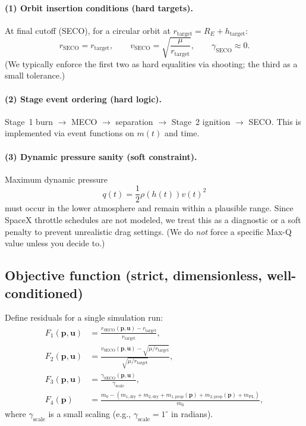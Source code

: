 \documentclass[11pt]{article}
\begin{document}
\paragraph{(1) Orbit insertion conditions (hard targets).}
At final cutoff (SECO), for a circular orbit at $r_{\text{target}}=R_E+h_{\text{target}}$:
\begin{equation}\label{eq:orbit_targets}
r_{\text{SECO}} = r_{\text{target}},\qquad
v_{\text{SECO}} = \sqrt{\frac{\mu}{r_{\text{target}}}},\qquad
\gamma_{\text{SECO}}\approx 0.
\end{equation}
(We typically enforce the first two as hard equalities via shooting; the third as a small tolerance.)

\paragraph{(2) Stage event ordering (hard logic).}
Stage~1 burn $\rightarrow$ MECO $\rightarrow$ separation $\rightarrow$ Stage~2 ignition $\rightarrow$ SECO.
This is implemented via event functions on $m(t)$ and time.

\paragraph{(3) Dynamic pressure sanity (soft constraint).}
Maximum dynamic pressure
\[
q(t)=\frac{1}{2}\rho(h(t))v(t)^2
\]
must occur in the lower atmosphere and remain within a plausible range. Since SpaceX throttle schedules are not modeled, we treat this as a diagnostic or a soft penalty to prevent unrealistic drag settings. (We do \emph{not} force a specific Max-Q value unless you decide to.)

\subsection{Objective function (strict, dimensionless, well-conditioned)}
Define residuals for a single simulation run:
\begin{align}
F_1(\bm{p},\bm{u})&=\frac{r_{\text{SECO}}(\bm{p},\bm{u})-r_{\text{target}}}{r_{\text{target}}},\\
F_2(\bm{p},\bm{u})&=\frac{v_{\text{SECO}}(\bm{p},\bm{u})-\sqrt{\mu/r_{\text{target}}}}{\sqrt{\mu/r_{\text{target}}}},\\
F_3(\bm{p},\bm{u})&=\frac{\gamma_{\text{SECO}}(\bm{p},\bm{u})}{\gamma_{\text{scale}}},\\
F_4(\bm{p})&=\frac{m_0-\left(m_{1,\text{dry}}+m_{2,\text{dry}}+m_{1,\text{prop}}(\bm{p})+m_{2,\text{prop}}(\bm{p})+m_{\text{PL}}\right)}{m_0},
\end{align}
where $\gamma_{\text{scale}}$ is a small scaling (e.g., $\gamma_{\text{scale}}=1^\circ$ in radians).
\end{document}
